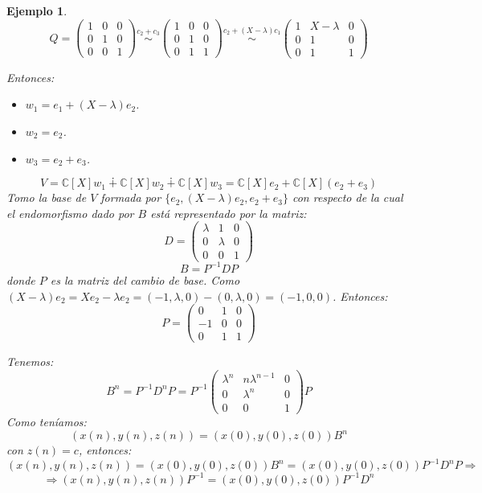 \documentclass[11pt,a4paper]{article}
\theoremstyle{break}
\newtheorem{example}[theorem]{Ejemplo}
\begin{document}
\begin{example}
$$Q = \begin{pmatrix}
1 & 0 & 0 \\
0 & 1 & 0 \\
0 & 0 & 1
\end{pmatrix} \overset{c_{2}+c_{3}}{\sim} \begin{pmatrix}
1 & 0 & 0 \\
0 & 1 & 0 \\
0 & 1 & 1
\end{pmatrix} \overset{c_{2} + (X-\lambda)c_{1}}{\sim} \begin{pmatrix}
1 & X-\lambda & 0 \\
0 & 1 & 0 \\
0 & 1 & 1
\end{pmatrix}$$

Entonces:
\begin{itemize}
\item $w_{1} = e_{1} + (X-\lambda)e_{2}$.
\item $w_{2} = e_{2}$.
\item $w_{3} = e_{2} + e_{3}$.
\end{itemize}
$$V = \mathbb{C}[X]w_{1} \dotplus \mathbb{C}[X]w_{2} \dotplus \mathbb{C}[X]w_{3} = \mathbb{C}[X]e_{2} + \mathbb{C}[X](e_{2}+e_{3})$$
Tomo la base de $V$ formada por $\{e_{2}, (X -\lambda)e_{2}, e_{2} + e_{3}\}$ con respecto de la cual el endomorfismo dado por $B$ está representado por la matriz:
$$D = \begin{pmatrix}
\lambda & 1 & 0 \\
0 & \lambda & 0 \\
0 & 0 & 1
\end{pmatrix}$$
$$B = P^{-1}DP$$
donde $P$ es la matriz del cambio de base. Como $(X-\lambda)e_{2} = Xe_{2} - \lambda e_{2} = (-1, \lambda, 0) - (0, \lambda, 0) = (-1, 0, 0)$. Entonces:
$$P = \begin{pmatrix}
0 & 1 & 0 \\
-1 & 0 & 0 \\
0 & 1 & 1
\end{pmatrix}$$

Tenemos:
$$B^{n} = P^{-1} D^{n} P = P^{-1} \begin{pmatrix}
\lambda^{n} & n \lambda^{n-1} & 0 \\
0 & \lambda^{n} & 0 \\
0 & 0 & 1
\end{pmatrix} P$$
Como teníamos:
$$(x(n), y(n), z(n)) = (x(0), y(0), z(0)) B^{n}$$
con $z(n) = c$, entonces:
$$(x(n), y(n), z(n)) = (x(0), y(0), z(0)) B^{n} = (x(0), y(0), z(0)) P^{-1} D^{n} P \Rightarrow$$
$$\Rightarrow (x(n), y(n), z(n))P^{-1} = (x(0), y(0), z(0)) P^{-1} D^{n}$$


\end{example}
\end{document}
